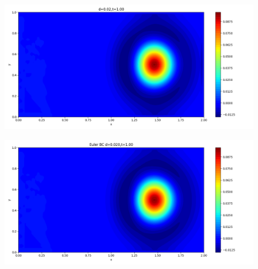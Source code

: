 \documentclass[12pt]{article}
\begin{document}
\begin{figure}[H]
\begin{minipage}{\linewidth}
    \begin{minipage}{0.5\textwidth}
    \includegraphics[width=\linewidth]{figures/3d0.02t1.00.png}
    \label{fig1}
    \end{minipage}\hfill
    \begin{minipage}{0.5\textwidth}
    \includegraphics[width=\linewidth]{figures/3Ed0.020t1.00.png}
    \label{fig2}
    \end{minipage}
    \vspace{-1.5em}
    

\end{minipage}
\end{figure}
\end{document}
